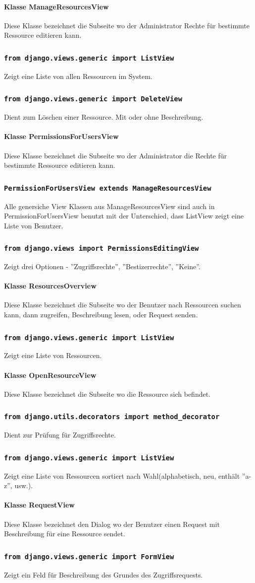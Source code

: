 \documentclass[parskip=full,11pt]{scrartcl}
\newcommand{\class}[1]{\subsubsection*{\lstinline[basicstyle=\ttfamily\large]{#1}}}
\begin{document}
\paragraph*{Klasse ManageResourcesView}
Diese Klasse bezeichnet die Subseite wo der Administrator Rechte für bestimmte Ressource editieren kann.
\class{from django.views.generic import ListView}
Zeigt eine Liste von allen Ressourcen im System.
\class{from django.views.generic import DeleteView}
Dient zum Löschen einer Ressource. Mit oder ohne Beschreibung.

\paragraph*{Klasse PermissionsForUsersView}
 Diese Klasse bezeichnet die Subseite wo der Administrator die Rechte für bestimmte Ressource editieren kann.
 \class{PermissionForUsersView extends ManageResourcesView}
 Alle genersiche View Klassen aus ManageResourcesView sind auch in PermissionForUsersView benutzt mit der Unterschied, dass ListView zeigt eine Liste von Benutzer.
 \class{from django.views import PermissionsEditingView}
 Zeigt drei Optionen - ''Zugriffsrechte'', ''Bestizerrechte'', ''Keine''.

\paragraph*{Klasse ResourcesOverview}
Diese Klasse bezeichnet die Subseite wo der Benutzer nach Ressourcen suchen kann, dann zugreifen, Beschreibung lesen, oder Request senden.
\class{from django.views.generic import ListView}
Zeigt eine Liste von Ressourcen.

\paragraph*{Klasse OpenResourceView}
Diese Klasse bezeichnet die Subseite wo die Ressource sich befindet.
\class{from django.utils.decorators import method_decorator}
Dient zur Prüfung für Zugriffsrechte.
\class{from django.views.generic import ListView}
Zeigt eine Liste von Ressourcen sortiert nach Wahl(alphabetisch, neu, enthält ''a-z'', usw.).

\paragraph*{Klasse RequestView}
Diese Klasse bezeichnet den Dialog wo der Benutzer einen Request mit Beschreibung für eine Ressource sendet.
\class{from django.views.generic import FormView}
Zeigt ein Feld für Beschreibung des Grundes des Zugriffsrequests.
\end{document}
